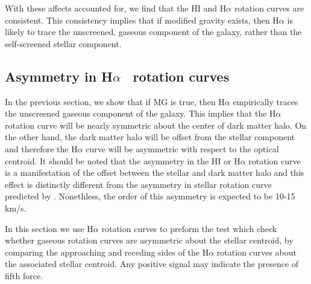 \documentclass[useAMS,usenatbib,twocolumn]{mn2e}
\newcommand{\ha}{H$\alpha$}
\begin{document}
With these affects accounted for, we find that the HI and \ha{} rotation
curves are consistent.  This consistency implies that if modified
gravity exists, then \ha{} is likely to trace the unscreened, gaseous
component of the galaxy, rather than the self-screened stellar component.


\subsection{Asymmetry in \ha~ rotation curves}\label{sec:asymmetry}

In the previous section, we show that if MG is true, then \ha{} empirically
traces the unscreened gaseous component of the galaxy. This implies
that the \ha{} rotation curve will be nearly symmetric about the
center of dark matter halo. On the other hand, the dark matter halo will be
offset from the stellar component and therefore the \ha{} curve will be
asymmetric with respect to the optical centroid. It should be noted that the
asymmetry in the HI or \ha{} rotation curve is a manifestation of the offset
between the stellar and dark matter halo and this effect is distinctly
different from the asymmetry in stellar rotation curve predicted by
\citet{bhuvjake2011}. Nonethless, the order of this asymmetry is
expected to be 10-15 km/s.

In this section we use \ha{} rotation curves to preform the test which check
whether gaseous rotation curves are asymmetric about the stellar centroid,
by comparing the approaching and receding sides of the \ha{} rotation curves
about the associated stellar centroid. Any
positive signal may indicate the presence of fifth force.
\end{document}
